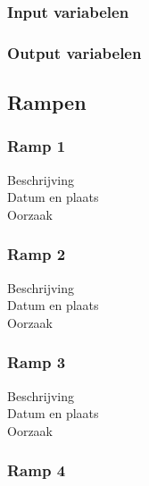 \documentclass{article}
\begin{document}
\subsubsection{Input variabelen}
\subsubsection{Output variabelen}

\subsection{Rampen}

\subsubsection{Ramp 1}
\begin{description}
\item[Beschrijving]
\item[Datum en plaats] 
\item[Oorzaak]
\end{description}

\subsubsection{Ramp 2}
\begin{description}
\item[Beschrijving]
\item[Datum en plaats] 
\item[Oorzaak]
\end{description}

\subsubsection{Ramp 3}
\begin{description}
\item[Beschrijving]
\item[Datum en plaats] 
\item[Oorzaak]
\end{description}

\subsubsection{Ramp 4}
\end{document}
